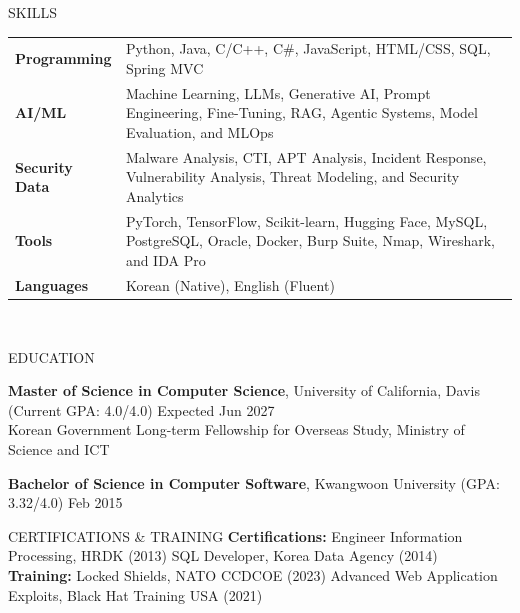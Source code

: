 \documentclass{resume}
\begin{document}
\begin{rSection}{SKILLS}
\begin{tabular}{ @{} >{\bfseries}l @{\hspace{2ex}} p{} }
Programming & Python, Java, C/C++, C\#, JavaScript, HTML/CSS, SQL, Spring MVC \\
AI/ML & Machine Learning, LLMs, Generative AI, Prompt Engineering, Fine-Tuning, RAG, Agentic Systems, Model Evaluation, and MLOps \\
Security Data & Malware Analysis, CTI, APT Analysis, Incident Response, Vulnerability Analysis, Threat Modeling, and Security Analytics \\
Tools & PyTorch, TensorFlow, Scikit-learn, Hugging Face, MySQL, PostgreSQL, Oracle, Docker, Burp Suite, Nmap, Wireshark, and IDA Pro \\
Languages & Korean (Native), English (Fluent) \\
\end{tabular}\\
\end{rSection}

\begin{rSection}{EDUCATION}

{\bf Master of Science in Computer Science}, University of California, Davis (Current GPA: 4.0/4.0) \hfill {Expected Jun 2027}\\
Korean Government Long-term Fellowship for Overseas Study, Ministry of Science and ICT

{\bf Bachelor of Science in Computer Software}, Kwangwoon University (GPA: 3.32/4.0) \hfill {Feb 2015}

\end{rSection}

\begin{rSection}{CERTIFICATIONS \& TRAINING}
\textbf{Certifications:} Engineer Information Processing, HRDK (2013) \quad SQL Developer, Korea Data Agency (2014) \\
\textbf{Training:} Locked Shields, NATO CCDCOE (2023) \quad Advanced Web Application Exploits, Black Hat Training USA (2021)
\end{rSection}
\end{document}
